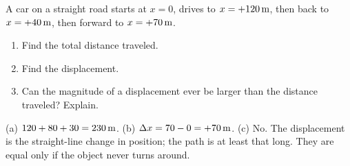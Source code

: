 \begin{exo}{}
A car on a straight road starts at $x=0$, drives to $x=+120\,\mathrm{m}$, then back to $x=+40\,\mathrm{m}$, then forward to $x=+70\,\mathrm{m}$.
\begin{enumerate}[label=(\alph*)]
\item Find the total distance traveled.
\item Find the displacement.
\item Can the magnitude of a displacement ever be larger than the distance traveled? Explain.
\end{enumerate}
\work{4cm}
\begin{solution}
(a) $120+80+30=230\,\mathrm{m}$. \;(b) $\Delta x=70-0=+70\,\mathrm{m}$. \;(c) No. The displacement is the straight-line change in position; the path is at least that long. They are equal only if the object never turns around.
\end{solution}
\end{exo}

